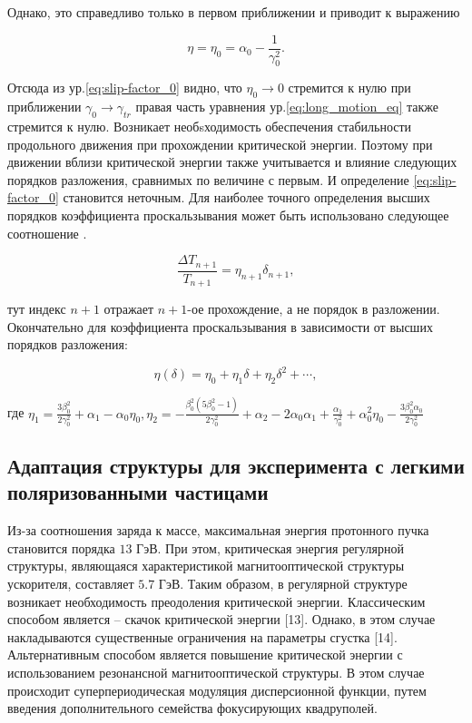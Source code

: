 \noindent Однако, это справедливо только в первом приближении и приводит к выражению

\begin{equation}
\eta = \eta_{0} = \alpha_{0} - \frac{1}{\gamma_{0}^2}.
\label{eq:slip-factor_0}
\end{equation}

\noindent Отсюда из ур.\ref{eq:slip-factor_0} видно, что $\eta_{0}\rightarrow 0$ стремится к нулю при приближении $\gamma_{0}\rightarrow\gamma_{tr}$ правая часть уравнения ур.\ref{eq:long_motion_eq} также стремится к нулю. Возникает необsходимость обеспечения стабильности продольного движения при прохождении критической энергии. Поэтому при движении вблизи критической энергии также учитывается и влияние следующих порядков разложения, сравнимых по величине с первым. И определение \ref{eq:slip-factor_0} становится неточным. Для наиболее точного определения высших порядков коэффициента проскальзывания может быть использовано следующее соотношение \cite{ng}.

\begin{equation}
\frac{\Delta T_{n+1}}{T_{n+1}}=\eta_{n+1} \delta_{n+1},
\end{equation}

\noindent тут индекс $n+1$ отражает $n+1$-ое прохождение, а не порядок в разложении. Окончательно для коэффициента проскальзывания в зависимости от высших порядков разложения:

\begin{equation}
\eta(\delta)=\eta_0+\eta_1 \delta+\eta_2 \delta^2+\cdots,
\label{eq:eta}
\end{equation}

\noindent где $\eta_1=\frac{3\beta_0^2}{2\gamma_0^2}+\alpha_1-\alpha_0\eta_0, \eta_2=-\frac{\beta_0^2\left(5 \beta_0^2-1\right)}{2 \gamma_0^2}+\alpha_2-2 \alpha_0 \alpha_1+\frac{\alpha_1}{\gamma_0^2}+\alpha_0^2 \eta_0-\frac{3 \beta_0^2 \alpha_0}{2 \gamma_0^2}$

\subsection{Адаптация структуры для эксперимента с легкими поляризованными частицами}\label{sec:ch:ions_light/transition/energy}

\par Из-за соотношения заряда к массе, максимальная энергия протонного пучка становится порядка $13$ ГэВ. При этом, критическая энергия регулярной структуры, являющаяся характеристикой магнитооптической структуры ускорителя, составляет $5.7$ ГэВ. Таким образом, в регулярной структуре возникает необходимость преодоления критической энергии. Классическим способом является – скачок критической энергии [13]. Однако, в этом случае накладываются существенные ограничения на параметры сгустка [14]. Альтернативным способом является повышение критической энергии с использованием резонансной магнитооптической структуры. В этом случае происходит суперпериодическая модуляция дисперсионной функции, путем введения дополнительного семейства фокусирующих квадруполей.

